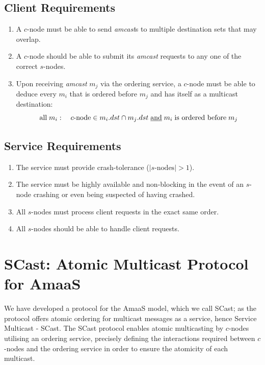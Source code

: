 	\subsection*{Client Requirements}
	\begin{enumerate}[label=\bfseries CR\arabic*]
		\item A $c$-node must be able to send \emph{amcast}s to multiple destination sets that may overlap.
		
		\item A $c$-node should be able to submit its \emph{amcast} requests to any one of the correct $s$-nodes.  
		
		\item Upon receiving \emph{amcast} $m_j$ via the ordering service, a $c$-node must be able to deduce every $m_i$ that is ordered before $m_j$ and has itself as a multicast destination:
		\begin{equation*}
		    \mbox{all}\; m_i : \quad c\mbox{-node} \in m_i.dst \cap m_j.dst \;\mbox{\underline{and}}\; m_i \;\mbox{is ordered before}\; m_j
		\end{equation*}
	\end{enumerate}
	
    \subsection*{Service Requirements}
	\begin{enumerate}[label=\bfseries SR\arabic*]
		\item The service must provide crash-tolerance ($|s\text{-nodes}| > 1$).
		
		\item The service must be highly available and non-blocking in the event of an $s$-node crashing or even being suspected of having crashed.  
				
		\item All $s$-nodes must process client requests in the exact same order.
		
		\item All $s$-nodes should be able to handle client requests.  %
	\end{enumerate}

\section{SCast: Atomic Multicast Protocol for AmaaS}\label{sec:scast_protocol}
We have developed a protocol for the \textsf{AmaaS} model, which we call \textsf{SCast}; as the protocol offers atomic ordering for multicast messages as a service, hence Service Multicast - \textsf{SCast}.  The \textsf{SCast} protocol enables atomic multicasting by $c$-nodes utilising an ordering service, precisely defining the interactions required between $c$-nodes and the ordering service in order to ensure the atomicity of each multicast.  

